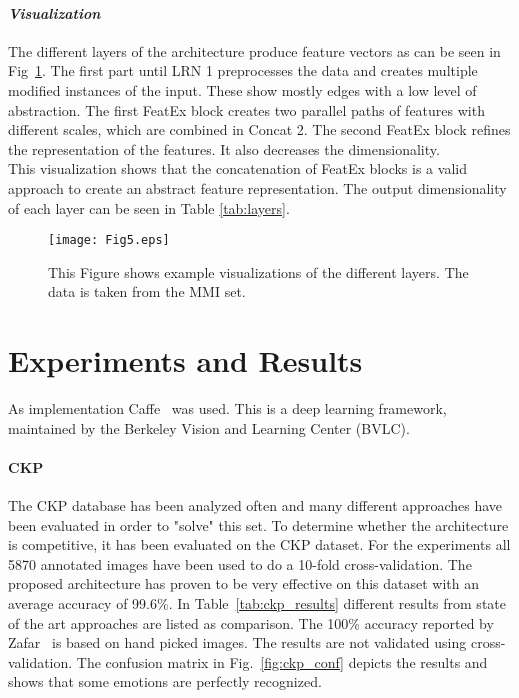 \documentclass[10pt,journal,compsoc, hidelinks]{IEEEtran}
\newcommand{\paraV}{\vspace{1em}}
\begin{document}
\paraV
\paragraph{\textit{Visualization}}
The different layers of the architecture produce feature vectors as can be seen in Fig~\ref{fig:feature_extraction}.
The first part until LRN 1 preprocesses the data and creates multiple modified instances of the input. These show mostly edges with a low level of abstraction. The first FeatEx block creates two parallel paths of features with different scales, which are combined in Concat 2. The second FeatEx block refines the representation of the features. It also decreases the dimensionality.\\
This visualization shows that the concatenation of FeatEx blocks is a valid approach to create an abstract feature representation. The output dimensionality of each layer can be seen in Table \ref{tab:layers}.

\begin{figure}[ht]
\centering
\texttt{[image: Fig5.eps]}
\caption{This Figure shows example visualizations of the different layers. The data is taken from the MMI set.}
\label{fig:feature_extraction}
\end{figure} \section{Experiments and Results}
\label{sec:experiments}


As implementation Caffe~\cite{jia2014caffe} was used. This is a deep learning framework, maintained by the Berkeley Vision and Learning Center (BVLC).


\paraV
\paragraph{\textbf{CKP}}
The CKP database has been analyzed often and many different approaches have been evaluated in order to "solve" this set.
To determine whether the architecture is competitive, it has been evaluated on the CKP dataset. For the experiments all 5870 annotated images have been used to do a 10-fold cross-validation. The proposed architecture has proven to be very effective on this dataset with an average accuracy of 99.6\%. In Table~\ref{tab:ckp_results} different results from state of the art approaches are listed as comparison. The 100\% accuracy reported by Zafar~\cite{6743520} is based on hand picked images. The results are not validated using cross-validation. The confusion matrix in Fig.~\ref{fig:ckp_conf} depicts the results and shows that some emotions are perfectly recognized.
\end{document}
